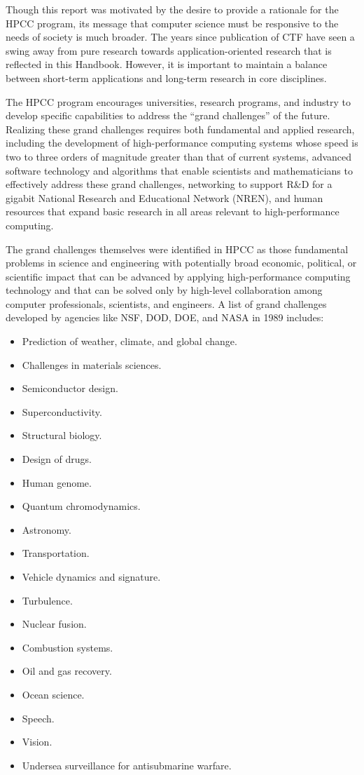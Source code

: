Though this report was motivated by the desire to provide a
rationale for the HPCC program, its message that computer
science must be responsive to the needs of society is much
broader. The years since publication of CTF have seen a swing
away from pure research towards application-oriented research
that is reflected in this Handbook. However, it is important to
maintain a balance between short-term applications and long-term
research in core disciplines.

\enlargethispage{-1pc}
The HPCC program encourages universities, research programs, and
industry to develop specific capabilities to address the ``grand
challenges'' of the future. Realizing these grand challenges
requires both fundamental and applied research, including the
development of high-performance computing systems whose speed is
two to three orders of magnitude greater than that of current
systems, advanced software technology and algorithms that enable
scientists and mathematicians to effectively address these grand
challenges, networking to support R\&D for a gigabit National
Research and Educational Network (NREN), and human resources that
expand basic research in all areas relevant to high-performance computing.

The grand challenges themselves were identified in HPCC as those
fundamental problems in science and engineering with potentially
broad economic, political, or scientific impact that can be
advanced by applying high-performance computing technology and
that can be solved only by high-level collaboration among
computer professionals, scientists, and engineers. A list of
grand challenges developed by agencies like NSF, DOD, DOE, and
NASA in 1989 includes:

\begin{itemize}
\item
 Prediction of weather, climate, and global change.
\item
 Challenges in materials sciences.
\item
 Semiconductor design.
\item
 Superconductivity.
\item
 Structural biology.
\item
 Design of drugs.
\item
 Human genome.
\item
 Quantum chromodynamics.
\item
 Astronomy.
\item
 Transportation.
\item
 Vehicle dynamics and signature.
\item
 Turbulence.
\item
 Nuclear fusion.
\item
 Combustion systems.
\item
 Oil and gas recovery.
\item
 Ocean science.
\item
 Speech.
\item
 Vision.
\item
 Undersea surveillance for antisubmarine warfare.
\end{itemize}

